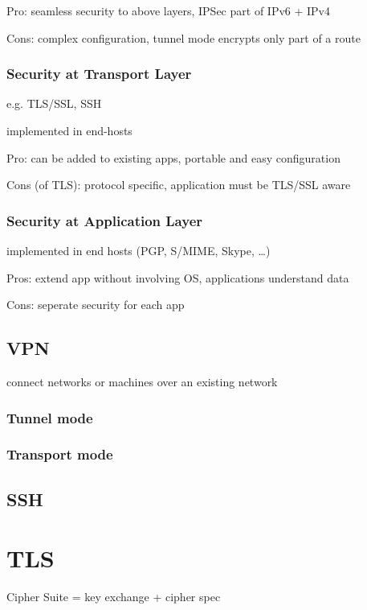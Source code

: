 \documentclass[fs, footer]{latex4ei}
\begin{document}
\begin{multicols*}{4}
{Pro: seamless security to above layers, IPSec part of IPv6 + IPv4

Cons: complex configuration, tunnel mode encrypts only part of a route


\subsubsection{Security at Transport Layer}
e.g. TLS/SSL, SSH

implemented in end-hosts

Pro: can be added to existing apps, portable and easy configuration

Cons (of TLS): protocol specific, application must be TLS/SSL aware


\subsubsection{Security at Application Layer}

implemented in end hosts (PGP, S/MIME, Skype, \ldots)

Pros: extend app without involving OS, applications understand data

Cons: seperate security for each app
}
\subsection{VPN}
connect networks or machines over an existing network

\subsubsection{Tunnel mode}

\subsubsection{Transport mode}

\subsection{SSH}


\section{TLS}
Cipher Suite = key exchange + cipher spec


\end{multicols*}
\end{document}

